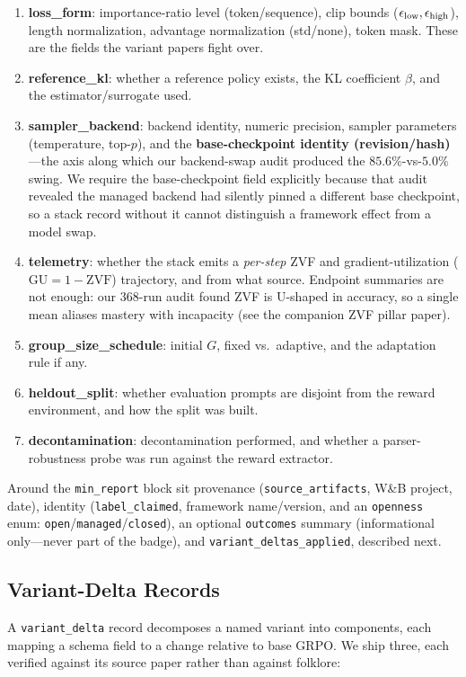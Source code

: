 \begin{enumerate}[leftmargin=1.8em, itemsep=0.1em]
  \item \textbf{loss_form}: importance-ratio level (token/sequence), clip
        bounds ($\epsilon_{\text{low}}, \epsilon_{\text{high}}$), length
        normalization, advantage normalization (std/none), token mask. These
        are the fields the variant papers fight over.
  \item \textbf{reference_kl}: whether a reference policy exists, the KL
        coefficient $\beta$, and the estimator/surrogate used.
  \item \textbf{sampler_backend}: backend identity, numeric precision, sampler
        parameters (temperature, top-$p$), and the \textbf{base-checkpoint
        identity (revision/hash)}---the axis along which our backend-swap audit
        produced the $85.6\%$-vs-$5.0\%$ swing. We require the base-checkpoint
        field explicitly because that audit revealed the managed backend had
        silently pinned a different base checkpoint, so a stack record without it
        cannot distinguish a framework effect from a model swap.
  \item \textbf{telemetry}: whether the stack emits a \emph{per-step} ZVF and
        gradient-utilization ($\mathrm{GU}=1-\mathrm{ZVF}$) trajectory, and
        from what source. Endpoint summaries are not enough: our 368-run audit
        found ZVF is U-shaped in accuracy, so a single mean aliases mastery
        with incapacity (see the companion ZVF pillar paper).
  \item \textbf{group_size_schedule}: initial $G$, fixed vs.\ adaptive, and
        the adaptation rule if any.
  \item \textbf{heldout_split}: whether evaluation prompts are disjoint from
        the reward environment, and how the split was built.
  \item \textbf{decontamination}: decontamination performed, and whether a
        parser-robustness probe was run against the reward extractor.
\end{enumerate}

Around the \texttt{min_report} block sit provenance
(\texttt{source_artifacts}, W\&B project, date), identity
(\texttt{label_claimed}, framework name/version, and an
\texttt{openness} enum: \texttt{open}/\texttt{managed}/\texttt{closed}), an
optional \texttt{outcomes} summary (informational only---never part of the
badge), and \texttt{variant_deltas_applied}, described next.

\subsection{Variant-Delta Records}
\label{sec:p6-schema-delta}
A \texttt{variant_delta} record decomposes a named variant into components,
each mapping a schema field to a change relative to base GRPO. We ship three,
each verified against its source paper rather than against folklore:

